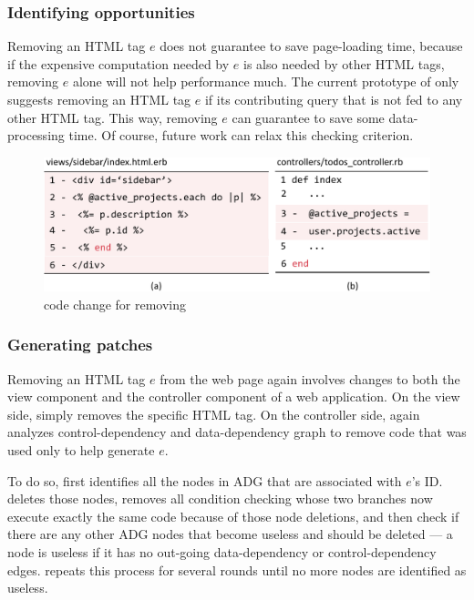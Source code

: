 \subsubsection{Identifying opportunities}
Removing an HTML tag $e$ does not guarantee to save page-loading time, because if the expensive
computation needed by $e$ is also needed by other HTML tags, removing $e$ alone will not help
performance much. The current prototype of \Tool only suggests removing an HTML tag $e$ if its contributing query that is not fed to any other HTML tag.
This way, removing $e$ can guarantee to save some data-processing time.
Of course, future work can relax this checking criterion.
\begin{figure}
    \centering
    \includegraphics[width=1\columnwidth]{panorama-figs/remove.pdf}

    \caption{code change for removing}
    \label{fig:remove}
    \vspace{-0.2in}
\end{figure}

\subsubsection{Generating patches}
Removing an HTML tag $e$ from the web page again involves changes to both the
view component and the controller component of a web application.
On the view side, \Tool simply removes the specific HTML tag.
On the controller side, \Tool again analyzes control-dependency and data-dependency graph
to remove code that was used only to help generate $e$.

To do so, \Tool first identifies all the nodes in ADG that are associated with $e$'s ID.
\Tool deletes those nodes, removes all condition checking whose two branches
now execute exactly the same code because of those node deletions, and then 
check if there are any other ADG nodes that
become useless and should be deleted
--- a node is useless if it has no out-going data-dependency or control-dependency
edges. \Tool repeats
this process for several rounds until no more nodes are identified as useless. 

